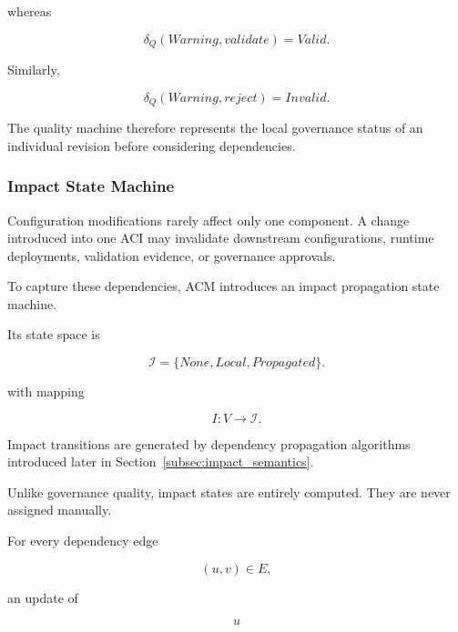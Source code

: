 \documentclass[10pt]{article}
\begin{document}
whereas

\begin{equation}
\delta_Q
(
Warning,
validate
)
=
Valid.
\label{eq:warning_to_valid}
\end{equation}

Similarly,

\begin{equation}
\delta_Q
(
Warning,
reject
)
=
Invalid.
\label{eq:warning_to_reject}
\end{equation}

The quality machine therefore represents the local governance status of an
individual revision before considering dependencies.

\subsubsection{Impact State Machine}

Configuration modifications rarely affect only one component.
A change introduced into one ACI may invalidate downstream configurations,
runtime deployments, validation evidence, or governance approvals.

To capture these dependencies, ACM introduces an impact propagation state
machine.

Its state space is

\begin{equation}
\mathcal{I}
=
\{
None,
Local,
Propagated
\}.
\label{eq:impact_state}
\end{equation}

with mapping

\begin{equation}
I
:
V
\rightarrow
\mathcal{I}.
\label{eq:mapping_impact_state}
\end{equation}

Impact transitions are generated by dependency propagation algorithms
introduced later in Section~\ref{subsec:impact_semantics}.

Unlike governance quality, impact states are entirely computed.
They are never assigned manually.

For every dependency edge

\begin{equation}
(u,v)\in E,
\label{eq:uv_definition}
\end{equation}

an update of

\begin{equation}
u
\label{eq:u_definition}
\end{equation}
\end{document}
